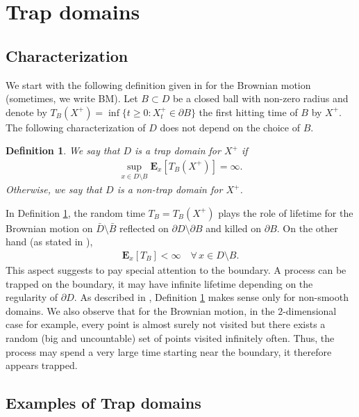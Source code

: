 \documentclass[[11pt,a4paper,reqno]{article}
\newtheorem{definition}{Definition}
\numberwithin{equation}{section}
\begin{document}
\section{Trap domains}
\label{sec:TrapDom}

\subsection{Characterization}

We start with the following definition given in \cite[formulas (1.1) and (1.2)]{BCM} for the Brownian motion (sometimes, we write BM). Let $B \subset D$ be a closed ball with non-zero radius and denote by $T_B (X^+) = \inf\{t \geq 0 : X^+_t \in  \partial B\}$ the first hitting time of $B$ by $X^+$. The following characterization of $D$ does not depend on the choice of $B$. 
\begin{definition}
\label{defTrapd}
We say that $D$ is a \emph{trap domain} for $X^+$ if 
\begin{align*}
\sup_{x \in D \setminus B} \mathbf{E}_x[T_B(X^+)] = \infty.
\end{align*}
Otherwise, we say that $D$ is a \emph{non-trap domain} for $X^+$.
\end{definition}
In Definition \ref{defTrapd}, the random time $T_B=T_B(X^+)$ plays the role of lifetime for the Brownian motion on $\bar{D} \setminus \bar{B}$ reflected on $\partial D \setminus \partial B$ and killed on $\partial B$. On the other hand (as stated in \cite[Lemma 3.2]{BCM}), 
\begin{align}
\mathbf{E}_x[T_B]< \infty \quad \forall\, x \in D \setminus B.
\end{align}
This aspect suggests to pay special attention to the boundary. A process can be trapped on the boundary, it may have infinite lifetime depending on the regularity of $\partial D$. As described in \cite{BCM}, Definition \ref{defTrapd} makes sense only for non-smooth domains. We also observe that for the Brownian motion,  in the $2$-dimensional case for example, every point is almost surely not visited but there exists a random (big and uncountable) set of points visited infinitely often. Thus, the process may spend a very large time starting near the boundary, it therefore appears trapped.


\subsection{Examples of Trap domains}
\label{sec:VariantOmega}
\end{document}
